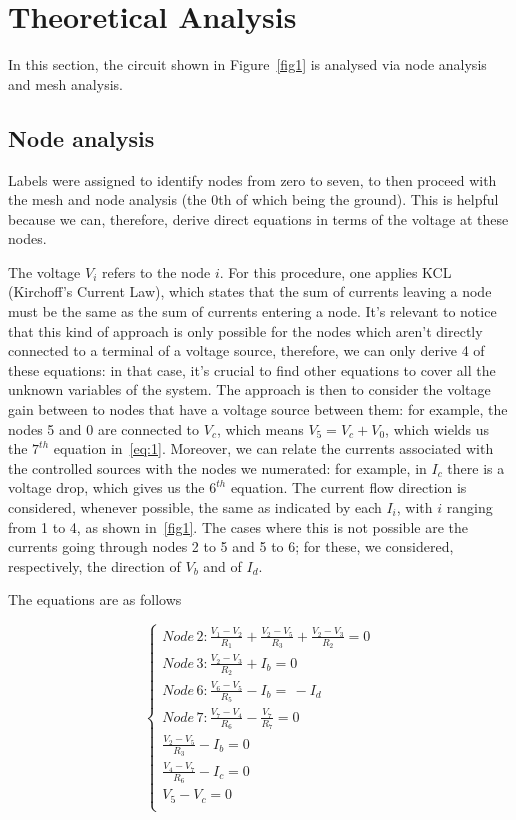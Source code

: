 \section{Theoretical Analysis}
\label{sec:analysis}

In this section, the circuit shown in Figure~\ref{fig1} is analysed via node analysis and mesh analysis.

\subsection{Node analysis}



Labels were assigned to identify nodes from zero to seven, to then proceed with the mesh and node analysis (the 0th of which being the ground). This is helpful because we can, therefore, derive direct equations in terms of the voltage at these nodes.

The voltage $V_i$ refers to the node $i$. For this procedure, one applies KCL (Kirchoff's Current Law), which states that the sum of currents leaving a node must be the same as the sum of currents entering a node. It's relevant to notice that this kind of approach is only possible for the nodes which aren't directly connected to a terminal of a voltage source, therefore, we can only derive 4 of these equations: in that case, it's crucial to find other equations to cover all the unknown variables of the system. The approach is then to consider the voltage gain between to nodes that have a voltage source between them: for example, the nodes 5 and 0 are connected to $V_c$, which means $V_5 = V_c + V_0$, which wields us the $7^{th}$ equation in~\ref{eq:1}. Moreover, we can relate the currents associated with the controlled sources with the nodes we numerated: for example, in $I_c$ there is a voltage drop, which gives us the $6^{th}$ equation.
The current flow direction is considered, whenever possible, the same as indicated by each $I_i$, with $i$ ranging from 1 to 4, as shown in~\ref{fig1}. The cases where this is not possible are the currents going through nodes 2 to 5 and 5 to 6; for these, we considered, respectively, the direction of $V_b$ and of $I_d$.

The equations are as follows

\begin{equation} 
\begin{cases}  
    Node\, 2: \frac{V_1 - V_2}{R_1} + \frac{V_2 - V_5}{R_3} + \frac{V_2 - V_3}{R_2} = 0 \\
    Node\, 3: \frac{V_2 - V_3}{R_2} + I_b = 0 \\
    Node\, 6: \frac{V_6 - V_5}{R_5} - I_b = \,  - I_d \\
    Node\, 7: \frac{V_7 - V_4}{R_6} - \frac{V_7}{R_7} = 0 \\
    \frac{V_2 - V_5}{R_3} - I_b = 0 \\
    \frac{V_4 - V_7}{R_6} - I_c = 0\\
    V_5 - V_c = 0\\
\end{cases}
\label{eq:1}
\end{equation}

